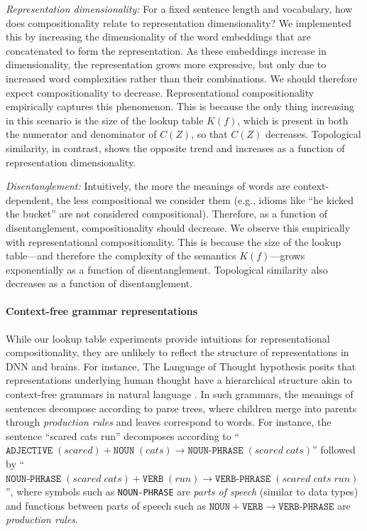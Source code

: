 \documentclass{article}
\newcommand{\comp}{representational compositionality}
\newcommand{\Comp}{Representational compositionality}
\begin{document}
\textit{Representation dimensionality:} For a fixed sentence length and vocabulary, how does compositionality relate to representation dimensionality? We implemented this by increasing the dimensionality of the word embeddings that are concatenated to form the representation. As these embeddings increase in dimensionality, the representation grows more expressive, but only due to increased word complexities rather than their combinations. We should therefore expect compositionality to decrease. \Comp{} empirically captures this phenomenon. This is because the only thing increasing in this scenario is the size of the lookup table $K(f)$, which is present in both the numerator and denominator of $C(Z)$, so that $C(Z)$ decreases. Topological similarity, in contrast, shows the opposite trend and increases as a function of representation dimensionality.


\textit{Disentanglement:} Intuitively, the more the meanings of words are context-dependent, the less compositional we consider them (e.g., idioms like ``he kicked the bucket'' are not considered compositional). Therefore, as a function of disentanglement, compositionality should decrease. We observe this empirically with \comp{}. This is because the size of the lookup table---and therefore the complexity of the semantics $K(f)$---grows exponentially as a function of disentanglement. Topological similarity also decreases as a function of disentanglement.

\paragraph{Context-free grammar representations} 

While our lookup table experiments provide intuitions for \comp{}, they are unlikely to reflect the structure of representations in DNN and brains. For instance, The Language of Thought hypothesis \citep{fodor1975language} posits that representations underlying human thought have a hierarchical structure akin to context-free grammars in natural language \citep{chomsky1956three}. In such grammars, the meanings of sentences decompose according to parse trees, where children merge into parents through \emph{production rules} and leaves correspond to words. For instance, the sentence ``scared cats run'' decomposes according to ``$\texttt{ADJECTIVE} \; (scared) + \texttt{NOUN} \; (cats) \rightarrow \texttt{NOUN-PHRASE} \; (scared \; cats)$'' followed by ``$\texttt{NOUN-PHRASE} \; (scared \; cats) + \texttt{VERB} \; (run) \rightarrow \texttt{VERB-PHRASE} \; (scared \; cats \; run)$'', where symbols such as \texttt{NOUN-PHRASE} are \emph{parts of speech} (similar to data types) and functions between parts of speech such as $\texttt{NOUN} + \texttt{VERB} \rightarrow \texttt{VERB-PHRASE}$ are \emph{production rules}.
\end{document}

